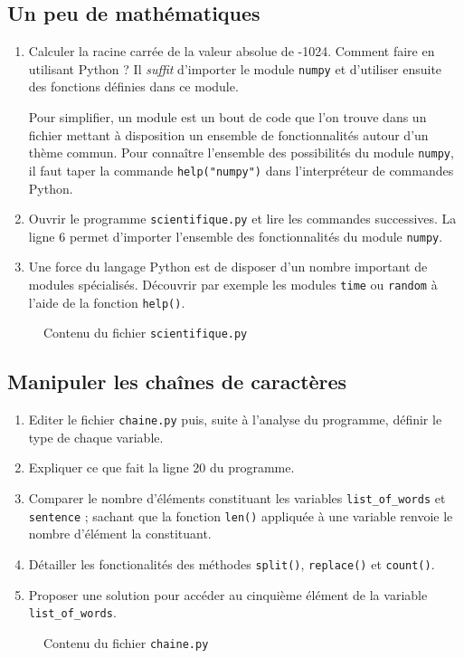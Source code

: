 \subsection{Un peu de mathématiques}

\begin{enumerate}
\item Calculer la racine carrée de la valeur absolue de -1024.
  Comment faire en utilisant Python ?
  Il \textit{suffit} d'importer le module \texttt{numpy} et d'utiliser ensuite
  des fonctions définies dans ce module.
  
  Pour simplifier, un module est un bout de code que l'on trouve dans un fichier
  mettant à disposition un ensemble de fonctionnalités autour d'un thème commun.
  Pour connaître l'ensemble des possibilités du module \texttt{numpy}, il faut taper la commande
  \texttt{help("numpy")} dans l'interpréteur de commandes Python.

\item Ouvrir le programme \texttt{scientifique.py} et lire les commandes successives.
  La ligne 6 permet d'importer l'ensemble des fonctionnalités du module \texttt{numpy}.

\item Une force du langage Python est de disposer d'un nombre important de modules spécialisés.
  Découvrir par exemple les modules \texttt{time} ou \texttt{random} à l'aide de la fonction \texttt{help()}.
\end{enumerate}


\begin{figure}  
  
  \caption{Contenu du fichier \texttt{scientifique.py}}
  \label{polynome_scientifique}
\end{figure}


\subsection{Manipuler les chaînes de caractères}


\begin{enumerate}

\item Editer le  fichier \texttt{chaine.py} puis,
  suite à l'analyse du programme, définir le type de chaque variable.

\item Expliquer ce que fait la ligne 20 du programme.

\item Comparer le nombre d'éléments constituant les variables
  \texttt{list\_of\_words} et  \texttt{sentence} ; sachant que la fonction \verb+len()+
  appliquée à une variable renvoie le nombre d'élément la constituant.
  
\item Détailler les fonctionalités des méthodes \texttt{split()}, \texttt{replace()} et \texttt{count()}.

\item Proposer une solution pour accéder au cinquième élément de la variable \texttt{list\_of\_words}.

\end{enumerate}


\begin{figure}  
  
  \caption{Contenu du fichier \texttt{chaine.py}}
  \label{polynome_chaine}
\end{figure}
